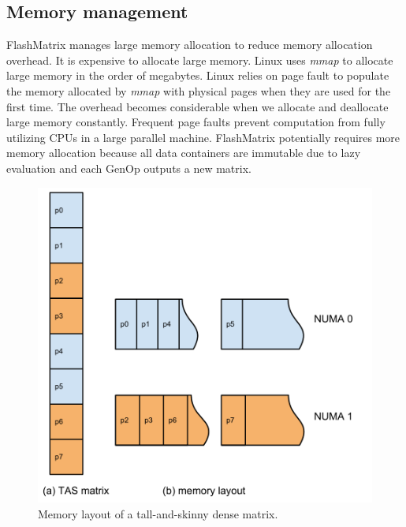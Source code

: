 
\subsection{Memory management} \label{sec:mem}
FlashMatrix manages large memory allocation to reduce memory allocation overhead.
It is expensive to allocate large memory. Linux uses \textit{mmap} to allocate
large memory in the order of megabytes. Linux relies on page fault to populate 
the memory allocated by \textit{mmap} with physical pages when they are used
for the first time. The overhead becomes considerable when we allocate and
deallocate large memory constantly. Frequent page faults prevent computation
from fully utilizing CPUs in a large parallel machine. FlashMatrix potentially
requires more memory allocation because all data containers are immutable due
to lazy evaluation and each GenOp outputs a new matrix.

\begin{figure}
	\centering
	\includegraphics[scale=0.5]{./matrix_mem.pdf}
	\caption{Memory layout of a tall-and-skinny dense matrix.}
	\label{fig:mat_mem}
\end{figure}

